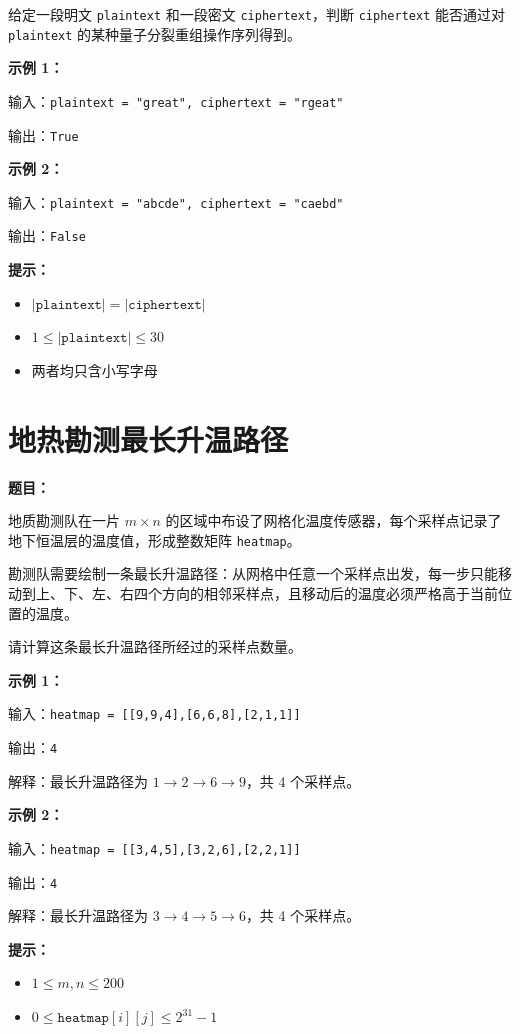 \documentclass[12pt, a4paper]{article}
\begin{document}
给定一段明文 \texttt{plaintext} 和一段密文 \texttt{ciphertext}，判断 \texttt{ciphertext} 能否通过对 \texttt{plaintext} 的某种量子分裂重组操作序列得到。

\textbf{示例 1：}

输入：\texttt{plaintext = "great", ciphertext = "rgeat"}

输出：\texttt{True}

\textbf{示例 2：}

输入：\texttt{plaintext = "abcde", ciphertext = "caebd"}

输出：\texttt{False}

\textbf{提示：}
\begin{itemize}[leftmargin=2em]
  \item $|\texttt{plaintext}| = |\texttt{ciphertext}|$
  \item $1 \leq |\texttt{plaintext}| \leq 30$
  \item 两者均只含小写字母
\end{itemize}



\section{地热勘测最长升温路径}

\noindent\textbf{题目：}

地质勘测队在一片 $m \times n$ 的区域中布设了网格化温度传感器，每个采样点记录了地下恒温层的温度值，形成整数矩阵 \texttt{heatmap}。

勘测队需要绘制一条最长升温路径：从网格中任意一个采样点出发，每一步只能移动到上、下、左、右四个方向的相邻采样点，且移动后的温度必须严格高于当前位置的温度。

请计算这条最长升温路径所经过的采样点数量。

\textbf{示例 1：}

输入：\texttt{heatmap = [[9,9,4],[6,6,8],[2,1,1]]}

输出：\texttt{4}

解释：最长升温路径为 $1 \to 2 \to 6 \to 9$，共 4 个采样点。

\textbf{示例 2：}

输入：\texttt{heatmap = [[3,4,5],[3,2,6],[2,2,1]]}

输出：\texttt{4}

解释：最长升温路径为 $3 \to 4 \to 5 \to 6$，共 4 个采样点。

\textbf{提示：}
\begin{itemize}[leftmargin=2em]
  \item $1 \leq m, n \leq 200$
  \item $0 \leq \texttt{heatmap}[i][j] \leq 2^{31}-1$
\end{itemize}
\end{document}
